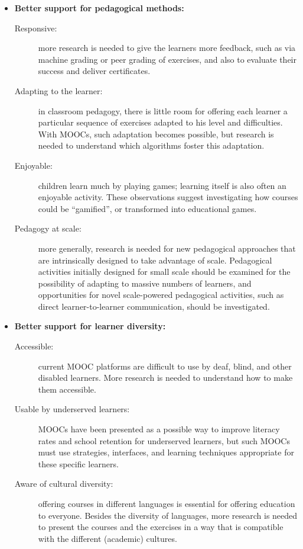 \begin{itemize}
\item \textbf{Better support for pedagogical methods:}
\begin{description}
\item[Responsive:] more research is needed to give the learners more
  feedback, such as via machine grading or peer grading of exercises,
  and also to evaluate their success and deliver certificates. 
\item[Adapting to the learner:] in classroom pedagogy, there is little room for offering each learner a particular sequence of exercises adapted to his level and difficulties. With MOOCs, such adaptation becomes possible, but research is needed to understand which algorithms foster this adaptation.
\item[Enjoyable:] children learn much by playing games; learning itself
  is also often an enjoyable activity. These observations suggest
  investigating how courses could be ``gamified'', or transformed into educational games.
\item[Pedagogy at scale:] more generally, research is needed for new pedagogical approaches that are intrinsically designed to take advantage of scale.
Pedagogical activities initially designed for small scale should be
examined for the possibility of 
adapting to massive numbers of learners, and  opportunities for novel
scale-powered pedagogical activities, such as direct learner-to-learner communication, should be investigated.
\end{description}
\item \textbf{Better support for learner diversity:}
\begin{description}
\item[Accessible:] current MOOC platforms are difficult to use by deaf, blind, and other disabled learners. More research is needed to understand how to make them accessible.
\item[Usable by underserved learners:] MOOCs have been presented as a
  possible way to improve literacy rates and school retention for
  underserved learners, but such MOOCs must use strategies, interfaces,
  and learning techniques appropriate for these specific learners.
\item[Aware of cultural diversity:] offering courses in different languages is essential for offering education to everyone. Besides the diversity of languages, more research is needed to present the courses and the exercises in a way that is compatible with the different (academic) cultures.


\end{description}
\end{itemize}

